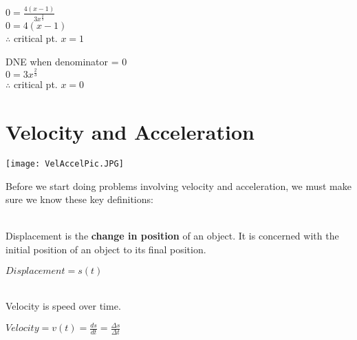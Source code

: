 \documentclass[12pt,fleqn]{book} %
\begin{document}
\begin{multicols}{2}
    \begin{center}
        $0= \frac{4(x-1)}{3x^\frac{2}{3}}$ \\
        \vspace*{1mm}
        $0 = 4(x-1)$ \\
        \vspace*{1mm}
        $\therefore$ critical pt. $x = 1$
        \columnbreak

        DNE when denominator = 0 \\
        \vspace*{1mm}
        $0 = 3x^\frac{2}{3}$ \\
        \vspace*{1mm}
        $\therefore$ critical pt. $x = 0$
    \end{center}
\end{multicols}




\section{Velocity and Acceleration}

\texttt{[image: VelAccelPic.JPG]}

\noindent Before we start doing problems involving velocity and acceleration, we must make sure we know these key definitions:

\vspace*{2mm}

 \\
Displacement is the \textbf{change in position} of an object. It is concerned with the initial position of an object to its final position.

\begin{center}
    {\large $Displacement = s(t)$}

\end{center}

\vspace*{2mm}

 \\
Velocity is speed over time.

\begin{center}
    {\large $Velocity = v(t) = \frac{ds}{dt} = \frac{\Delta s}{\Delta t}$}

\end{center}
\end{document}
